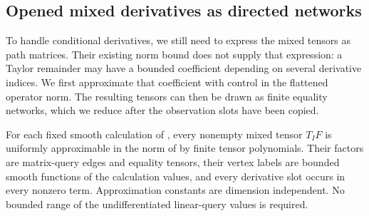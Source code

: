 \subsection{Opened mixed derivatives as directed networks}

To handle conditional derivatives, we still need to express the mixed
tensors as path matrices.  Their existing norm bound does not supply
that expression: a Taylor remainder may have a bounded coefficient
depending on several derivative indices.  We first approximate that
coefficient with control in the flattened operator norm.  The
resulting tensors can then be drawn as finite equality networks,
which we reduce after the observation slots have been copied.

\begin{lemma}
\label{lem:path-increment-approximation}
For each fixed smooth calculation of
, every nonempty mixed tensor $T_IF$
is uniformly approximable in the norm of
 by finite tensor polynomials.  Their factors
are matrix-query edges and equality tensors, their vertex labels are
bounded smooth functions of the calculation values, and every
derivative slot occurs in every nonzero term.  Approximation constants
are dimension independent.  No bounded range of the undifferentiated
linear-query values is required.
\end{lemma}

